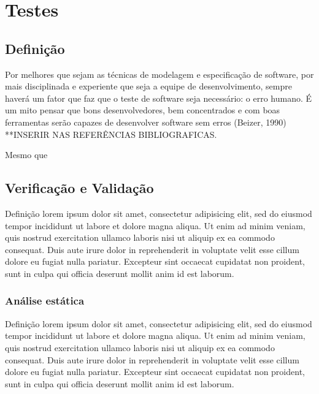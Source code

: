 \documentclass[
	12pt,				%
	openright,			%
	twoside,			%
	a4paper,			%
	english,			%
	brazil,				%
	]{abntex2}
\begin{document}
\chapter{Testes}

\section{Definição}

\begin{citacao}
Por melhores que sejam as técnicas de modelagem e especificação de software, por mais disciplinada e experiente que seja a equipe de desenvolvimento, sempre haverá um fator que faz que o teste de software seja necessário: o erro humano. É um mito pensar que bons desenvolvedores, bem concentrados e com boas ferramentas serão capazes de desenvolver software sem erros (Beizer, 1990) **INSERIR NAS REFERÊNCIAS BIBLIOGRAFICAS.
\end{citacao}

Mesmo que 

\section{Verificação e Validação}

Definição lorem ipsum dolor sit amet, consectetur adipisicing elit, sed do eiusmod
tempor incididunt ut labore et dolore magna aliqua. Ut enim ad minim veniam,
quis nostrud exercitation ullamco laboris nisi ut aliquip ex ea commodo
consequat. Duis aute irure dolor in reprehenderit in voluptate velit esse
cillum dolore eu fugiat nulla pariatur. Excepteur sint occaecat cupidatat non
proident, sunt in culpa qui officia deserunt mollit anim id est laborum.


\subsection{Análise estática}

Definição lorem ipsum dolor sit amet, consectetur adipisicing elit, sed do eiusmod
tempor incididunt ut labore et dolore magna aliqua. Ut enim ad minim veniam,
quis nostrud exercitation ullamco laboris nisi ut aliquip ex ea commodo
consequat. Duis aute irure dolor in reprehenderit in voluptate velit esse
cillum dolore eu fugiat nulla pariatur. Excepteur sint occaecat cupidatat non
proident, sunt in culpa qui officia deserunt mollit anim id est laborum.
\end{document}
